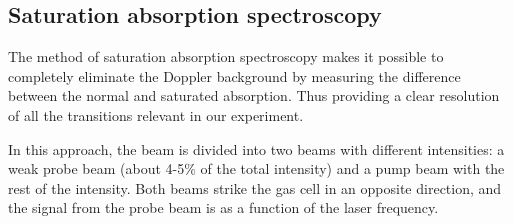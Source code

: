 \documentclass{article}
\begin{document}
\subsection{Saturation absorption spectroscopy}

The method of saturation absorption spectroscopy makes it possible to completely eliminate the Doppler background by measuring the difference between the normal and saturated absorption. Thus providing a clear resolution of all the transitions relevant in our experiment. 

In this approach, the beam is divided into two beams with different intensities: a weak probe beam (about 4-5\% of the total intensity) and a pump beam with the rest of the intensity. Both beams strike the gas cell in an opposite direction, and the signal from the probe beam is as a function of the laser frequency.
\end{document}
